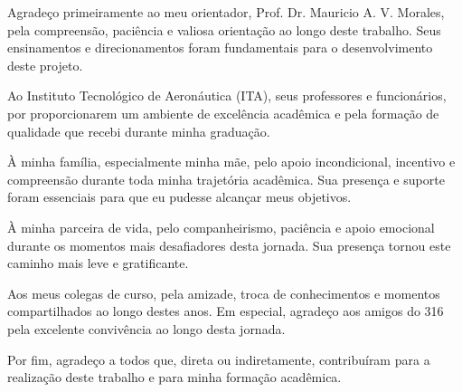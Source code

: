 Agradeço primeiramente ao meu orientador, Prof. Dr. Mauricio A. V. Morales, pela compreensão, paciência e valiosa orientação ao longo deste trabalho. Seus ensinamentos e direcionamentos foram fundamentais para o desenvolvimento deste projeto.

Ao Instituto Tecnológico de Aeronáutica (ITA), seus professores e funcionários, por proporcionarem um ambiente de excelência acadêmica e pela formação de qualidade que recebi durante minha graduação.

À minha família, especialmente minha mãe, pelo apoio incondicional, incentivo e compreensão durante toda minha trajetória acadêmica. Sua presença e suporte foram essenciais para que eu pudesse alcançar meus objetivos.

À minha parceira de vida, pelo companheirismo, paciência e apoio emocional durante os momentos mais desafiadores desta jornada. Sua presença tornou este caminho mais leve e gratificante.

Aos meus colegas de curso, pela amizade, troca de conhecimentos e momentos compartilhados ao longo destes anos. Em especial, agradeço aos amigos do 316 pela excelente convivência ao longo desta jornada.

Por fim, agradeço a todos que, direta ou indiretamente, contribuíram para a realização deste trabalho e para minha formação acadêmica.